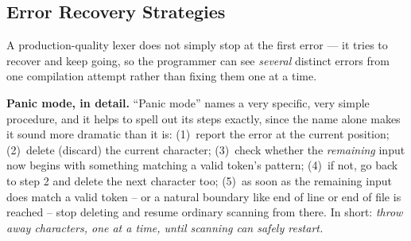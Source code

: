 \documentclass[full-course-notes.tex]{subfiles}
\begin{document}
\subsection{Error Recovery Strategies}
\label{sec:l3-error-recovery}

\dbtag A production-quality lexer does not simply stop at the first error --- it tries to
recover and keep going, so the programmer can see \emph{several} distinct errors from one
compilation attempt rather than fixing them one at a time.

\begin{center}
\end{center}

\dbtag \textbf{Panic mode, in detail.} ``Panic mode'' names a very specific, very simple
procedure, and it helps to spell out its steps exactly, since the name alone makes it sound more
dramatic than it is: (1)~report the error at the current position; (2)~delete (discard) the
current character; (3)~check whether the \emph{remaining} input now begins with something
matching a valid token's pattern; (4)~if not, go back to step 2 and delete the next character
too; (5)~as soon as the remaining input does match a valid token -- or a natural boundary like
end of line or end of file is reached -- stop deleting and resume ordinary scanning from there.
In short: \emph{throw away characters, one at a time, until scanning can safely restart.}
\end{document}
